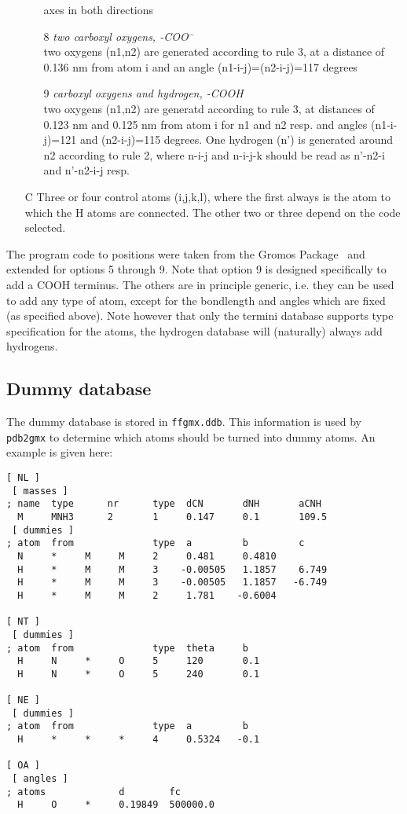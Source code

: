 \begin{itemize}
\begin{enumerate}
axes in both directions
\item[8]{\em two carboxyl oxygens, -COO{$^-$}}\\
two oxygens (n1,n2) are generated according to rule 3, at a distance
of 0.136 nm from atom i and an angle (n1-i-j)=(n2-i-j)=117 degrees
\item[9]{\em carboxyl oxygens and hydrogen, -COOH}\\
two oxygens (n1,n2) are generatd according to rule 3, at distances of
0.123 nm and 0.125 nm from atom i for n1 and n2 resp. and angles
(n1-i-j)=121 and (n2-i-j)=115 degrees. One hydrogen (n') is generated
around n2 according to rule 2, where n-i-j and n-i-j-k should be read
as n'-n2-i and n'-n2-i-j resp.
\end{enumerate}
\item[C]
Three or four control atoms (i,j,k,l), where the first always is the
atom to which the H atoms are connected. The other two or three depend
on the code selected.
\end{itemize}

The program code to  positions were taken
from the Gromos Package~\cite{biomos} and extended for options 5
through 9. Note that option 9 is designed specifically to add a COOH
terminus. The others are in principle generic, i.e. they can be used
to add any type of atom, except for the bondlength and angles which
are fixed (as specified above). Note however that only the termini
database supports type specification for the atoms, the hydrogen
database will (naturally) always add hydrogens.

\newcommand{\amine}{-NH$_2$}
\newcommand{\amines}{-NH-}
\newcommand{\aminep}{-NH$_3^+$}
\subsection{Dummy database}
The dummy database is stored in \verb'ffgmx.ddb'. This information is
used by \verb'pdb2gmx' to determine which atoms should be turned into
dummy atoms. An example is given here:

{\small\begin{verbatim}
[ NL ]
 [ masses ]
; name  type      nr      type  dCN       dNH       aCNH
  M     MNH3      2       1     0.147     0.1       109.5
 [ dummies ]
; atom  from              type  a         b         c
  N     *     M     M     2     0.481     0.4810
  H     *     M     M     3    -0.00505   1.1857    6.749
  H     *     M     M     3    -0.00505   1.1857   -6.749
  H     *     M     M     2     1.781    -0.6004

[ NT ]
 [ dummies ]
; atom  from              type  theta     b
  H     N     *     O     5     120       0.1
  H     N     *     O     5     240       0.1

[ NE ]
 [ dummies ]
; atom  from              type  a         b
  H     *     *     *     4     0.5324   -0.1

[ OA ]
 [ angles ]
; atoms             d        fc
  H     O     *     0.19849  500000.0
\end{verbatim}}

